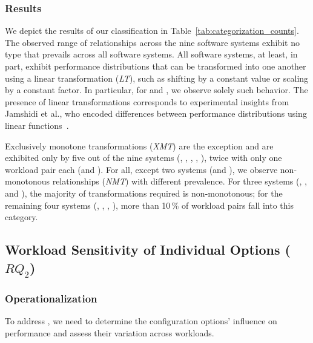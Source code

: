{{\subsubsection{Results}
{\color{black}
We depict the results of our classification in Table~\ref{tab:categorization_counts}. The observed range of relationships across the nine software systems exhibit no type that prevails across all software systems. 
All software systems, at least, in part, exhibit performance distributions that can be transformed into one another using a linear transformation (\textit{\colorbox{lt-color}{LT}}), such as shifting by a constant value or scaling by a constant factor. In particular, for \jumper and \xzwo, we observe solely such behavior. The presence of linear transformations corresponds to experimental insights from Jamshidi et al., who encoded differences between performance distributions using linear functions~\cite{jamishidi_transfer_2017}.

Exclusively monotone transformations (\textit{\colorbox{xmt-color}{XMT}}) are the exception and are exhibited only by five out of the nine systems (\kanzi, \batik, \xz, \lrzip, \zdrei), twice with only one workload pair each (\xz and \zdrei).  
For all, except two systems (\jumper and \xzwo), we observe non-monotonous relationships (\textit{\colorbox{nmt-color}{NMT}}) with different prevalence.  For three systems (\dconvert, \htwo, and \zdrei), the majority of transformations required is non-monotonous; for the remaining four systems (\kanzi, \batik, \xz, \lrzip), more than 10\,\% of workload pairs fall into this category.

\vspace{1mm}

\subsection{Workload Sensitivity of Individual Options ($RQ_2$)}\label{sec:rq2}

\subsubsection{Operationalization}
To address , we need to determine the configuration options’ influence on performance and assess their variation across workloads. 

}}}
